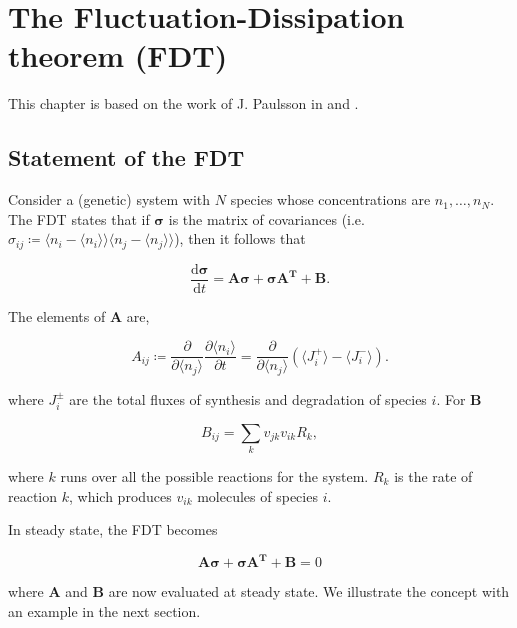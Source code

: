 \chapter{The Fluctuation-Dissipation theorem (FDT)}
\label{ch:fdt}
This chapter is based on the work of J. Paulsson in \cite{paulsson04} and \cite{paulsson05}.

\section{Statement of the FDT}

Consider a (genetic) system with $N$ species whose concentrations are $n_1,\dotsc,n_N$. The FDT states that if $\mathbf{\sigma}$ is the matrix of covariances (i.e. $\sigma_{ij} \coloneqq \langle n_i-\langle n_i\rangle\rangle\langle n_j-\langle n_j\rangle\rangle$), then it follows that 

\begin{equation}
  \label{eq:fdt-fdt1}
  \frac{\mathrm{d}\mathbf{\sigma}}{\mathrm{d}t} = \mathbf{A\sigma} + \mathbf{\sigma A^T}+\mathbf{B}.
\end{equation}

The elements of $\mathbf{A}$ are,

\begin{equation}
  \label{eq:fdt-Adef}
  A_{ij} \coloneqq \frac{\partial}{\partial \langle n_j\rangle}\frac{\partial \langle n_i\rangle}{\partial t} = \frac{\partial}{\partial \langle n_j\rangle}\left(\langle J_i^+\rangle - \langle J_i^-\rangle\right).
\end{equation}

where $J_i^\pm$ are the total fluxes of synthesis and degradation of species $i$. For $\mathbf{B}$

\begin{equation*}
  \label{eq:fdt-Bdef}
  B_{ij} = \sum_k v_{jk}v_{ik}R_k,
\end{equation*}

where $k$ runs over all the possible reactions for the system. $R_k$ is the rate of reaction $k$, which produces $v_{ik}$ molecules of species $i$.

In steady state, the FDT becomes

\begin{equation}
  \label{eq:fdt-fdtss}
  \mathbf{A\sigma}+\mathbf{\sigma A^T}+\mathbf{B} = 0
\end{equation}

where $\mathbf{A}$ and $\mathbf{B}$ are now evaluated at steady state. We illustrate the concept with an example in the next section.

